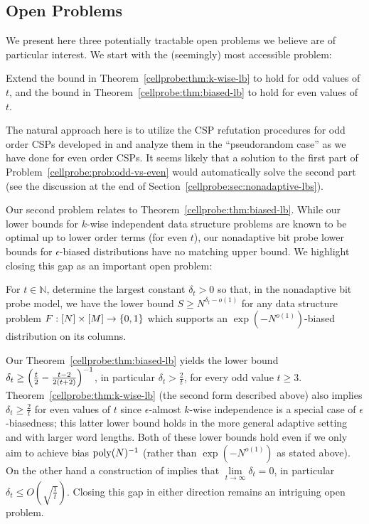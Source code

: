 \subsection{Open Problems}
We present here three potentially tractable open problems we believe are of particular interest.
We start with the (seemingly) most accessible problem:
\begin{problem}
Extend the bound in Theorem~\ref{cellprobe:thm:k-wise-lb} to hold for odd values of $t$, and the bound in Theorem~\ref{cellprobe:thm:biased-lb} to hold for even values of $t$.
\end{problem}
 The natural approach here is to utilize the CSP refutation procedures for odd order CSPs developed in \cite{semirandom,smoothed} and analyze them in the ``pseudorandom case'' as we have done for even order CSPs. It seems likely that a solution to the first part of Problem~\ref{cellprobe:prob:odd-vs-even} would automatically solve the second part (see the discussion at the end of Section~\ref{cellprobe:sec:nonadaptive-lbs}).

Our second problem relates to Theorem~\ref{cellprobe:thm:biased-lb}. While our lower bounds for $k$-wise independent data structure problems are known to be optimal up to lower order terms (for even $t$), our nonadaptive bit probe lower bounds for $\epsilon$-biased distributions have no matching upper bound. We highlight closing this gap as an important open problem:
\begin{problem}
For $t \in \mathbb{N}$, determine the largest constant $\delta_t >0$ so that, in the nonadaptive bit probe model, we have the lower bound $S \geq N^{\delta_t-o(1)}$ for any data structure problem $F:[N] \times [M] \to \{0,1\}$ which supports an $\exp(-N^{o(1)})$-biased distribution on its columns.
\end{problem}
Our Theorem~\ref{cellprobe:thm:biased-lb} yields the lower bound $\delta_t\geq \Bigl( \frac{t}{2} - \frac{t-2}{2(t+2)}\Bigr)^{-1}$, in particular $\delta_t > \frac{2}{t}$, for every odd value $t \geq 3$. Theorem~\ref{cellprobe:thm:k-wise-lb} (the second form described above) also implies $\delta_t \geq \frac{2}{t}$ for even values of $t$ since $\epsilon$-almost $k$-wise independence is a special case of $\epsilon$-biasedness; this latter lower bound holds in the more general adaptive setting and with larger word lengths. Both of these lower bounds hold even if we only aim to achieve bias $\mathrm{poly}(N)^{-1}$ (rather than $\exp(-N^{o(1)})$ as stated above). On the other hand a construction of \cite{mossel-epsilon} implies that $\lim\limits_{t \to \infty} \delta_t = 0$, in particular $\delta_t \leq O(\sqrt{\frac{1}{t}} )$. Closing this gap in either direction remains an intriguing open problem.


